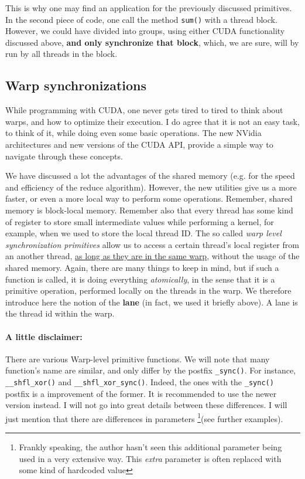 This is why one may find an application for the previously discussed primitives. 
In the second piece of code, one call the method \verb|sum()| with a thread block. However, 
we could have divided into groups, using either CUDA functionality discussed above, 
\textbf{and only synchronize that block}, which, we are sure, will by run by all threads in 
the block. 

\subsection*{Warp synchronizations}
While programming with CUDA, one never gets tired to tired to think about warps, and 
how to optimize their execution. I do agree that it is not an easy task, to think of it, 
while doing even some basic operations. The new NVidia architectures and new versions of the
CUDA API, provide a simple way to navigate through these concepts.

We have discussed a lot the advantages of the shared memory (e.g. for the speed and efficiency
of the reduce algorithm). However, the new utilities give us a more faster, or even a more
local way to perform some operations. Remember, shared memory is block-local memory. 
Remember also that every thread has some kind of register to store small intermediate 
values while performing a kernel, for example, when
we used to store the local thread ID. 
The so called \textit{warp level synchronization primitives}
allow us to access a certain thread's local register from an another thread,
\underline{as long as they are in the same warp}, without 
the usage of the shared memory. Again, there are many things to keep in mind, 
but if such a function is called, it is doing everything \textit{atomically}, 
in the sense that it is a primitive operation, performed locally on the threads in the 
warp. We therefore introduce here the notion of the 
\textbf{lane} (in fact, we used it briefly above). A lane is the thread id within the warp.


\paragraph{A little disclaimer: }There are various Warp-level primitive functions. We will note that many function's
name are similar, and only differ by the postfix \verb|_sync()|. For instance, 
\verb|__shfl_xor()| and \verb|__shfl_xor_sync()|. Indeed, the ones with the \verb|_sync()|
postfix is a improvement of the former. It is recommended to use the newer version instead.
I will not go into great details between these differences. 
I will just mention that there are differences in parameters
\footnote{Frankly speaking, the author hasn't seen this additional parameter 
being used in a very extensive way. This \textit{extra} parameter is often replaced with 
some kind of hardcoded value}(see further examples).


